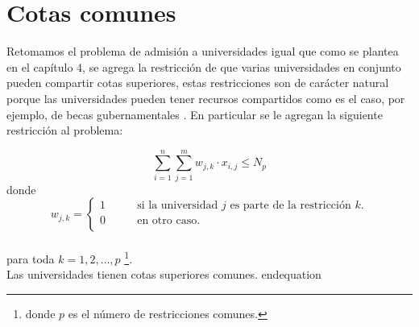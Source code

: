 \chapter{Cotas comunes}

Retomamos el problema de admisión a universidades igual que como se plantea en el capítulo 4, se agrega la restricción de que varias universidades en conjunto pueden compartir cotas superiores, estas restricciones son de carácter natural porque las universidades pueden tener recursos compartidos como es el caso, por ejemplo, de becas gubernamentales . En particular se le agregan la siguiente restricción al problema:


\begin{equation}
\sum_{i=1}^{n} \sum_{j=1}^m w_{j,k} \cdot x_{i,j} \leq N_p %
\end{equation} 
donde \begin{equation} w_{j,k}= 
\begin{cases}
1 & \qquad \text{si la universidad $j$ es parte de la restricción $k$.} \\
0 &\qquad\text{en otro caso.} \\ 
\end{cases} \end{equation} \\ para toda $k=1,2,\dots,p$ \footnote{donde $p$ es el número de restricciones comunes.}. \\
Las universidades tienen cotas superiores comunes.
end{equation}




